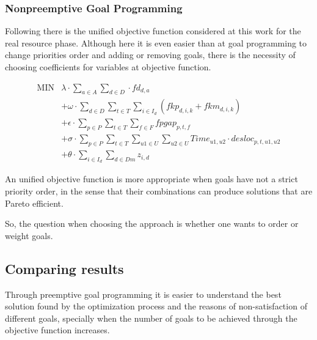 \subsubsection{Nonpreemptive Goal Programming}

Following there is the unified objective function considered at this work for the real resource phase. Although here it is even easier than at goal programming to change priorities order and adding or removing goals, there is the necessity of choosing coefficients for variables at objective function.

$$
\begin{array}{rl}
   \mbox{MIN} &
			\lambda \cdot \sum\limits_{a \in A}\sum\limits_{d \in D} \cdot fd_{d,a}
      \\
      &
      + \omega \cdot \sum\limits_{d \in D} 
\sum\limits_{t \in T} \sum\limits_{i \in I_{d}} (fkp_{d,i,k} + fkm_{d,i,k})
      \\
      &
      + \epsilon \cdot \sum\limits_{p \in P} \sum\limits_{t \in T} \sum\limits_{f \in F} fpgap_{p,t,f}
      \\
      &
			+ \sigma \cdot \sum\limits_{p \in P} \sum\limits_{t \in T} \sum\limits_{u1 \in U} \sum\limits_{u2 \in U} Time_{u1,u2} \cdot desloc_{p,t,u1,u2}
			\\
			&
      + \theta \cdot \sum\limits_{i \in I_{d}} \sum\limits_{d \in Dm} z_{i,d}
\end{array}
$$

An unified objective function is more appropriate when goals have not a strict priority order, in the sense that their combinations can produce solutions that are Pareto efficient.

So, the question when choosing the approach is whether one wants to order or weight goals.


\subsection{Comparing results}

Through preemptive goal programming it is easier to understand the best solution found by the optimization process and the reasons of non-satisfaction of different goals, specially when the number of goals to be achieved through the objective function increases.





